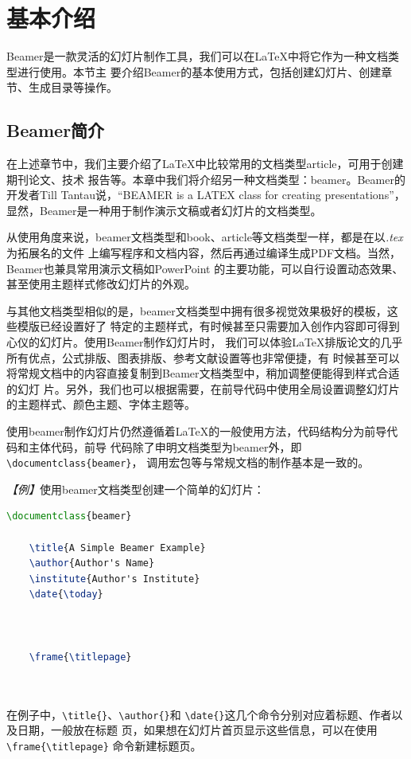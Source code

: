 \section{基本介绍}

Beamer是一款灵活的幻灯片制作工具，我们可以在LaTeX中将它作为一种文档类型进行使用。本节主
要介绍Beamer的基本使用方式，包括创建幻灯片、创建章节、生成目录等操作。

\subsection{Beamer简介}

在上述章节中，我们主要介绍了LaTeX中比较常用的文档类型article，可用于创建期刊论文、技术
报告等。本章中我们将介绍另一种文档类型：beamer。Beamer的开发者Till Tantau说，“BEAMER is a LATEX class for creating presentations”，显然，Beamer是一种用于制作演示文稿或者幻灯片的文档类型。

从使用角度来说，beamer文档类型和book、article等文档类型一样，都是在以\emph{.tex}为拓展名的文件
上编写程序和文档内容，然后再通过编译生成PDF文档。当然，Beamer也兼具常用演示文稿如PowerPoint
的主要功能，可以自行设置动态效果、甚至使用主题样式修改幻灯片的外观。

与其他文档类型相似的是，beamer文档类型中拥有很多视觉效果极好的模板，这些模版已经设置好了
特定的主题样式，有时候甚至只需要加入创作内容即可得到心仪的幻灯片。使用Beamer制作幻灯片时，
我们可以体验LaTeX排版论文的几乎所有优点，公式排版、图表排版、参考文献设置等也非常便捷，有
时候甚至可以将常规文档中的内容直接复制到Beamer文档类型中，稍加调整便能得到样式合适的幻灯
片。另外，我们也可以根据需要，在前导代码中使用全局设置调整幻灯片的主题样式、颜色主题、字体主题等。

使用beamer制作幻灯片仍然遵循着LaTeX的一般使用方法，代码结构分为前导代码和主体代码，前导
代码除了申明文档类型为beamer外，即\texttt{\textbackslash{}documentclass\{beamer\}}，
调用宏包等与常规文档的制作基本是一致的。

\emph{【例】}使用beamer文档类型创建一个简单的幻灯片：
\begin{lstlisting}[language=TeX]
    \documentclass{beamer}

    \title{A Simple Beamer Example}
    \author{Author's Name}
    \institute{Author's Institute}
    \date{\today} 

    

    \frame{\titlepage}

    
\end{lstlisting}

在例子中，\texttt{\textbackslash{}title\{\}}、\texttt{\textbackslash{}author\{\}}和
\texttt{\textbackslash{}date\{\}}这几个命令分别对应着标题、作者以及日期，一般放在标题
页，如果想在幻灯片首页显示这些信息，可以在使用\texttt{\textbackslash{}frame\{\textbackslash{}titlepage\}}
命令新建标题页。

